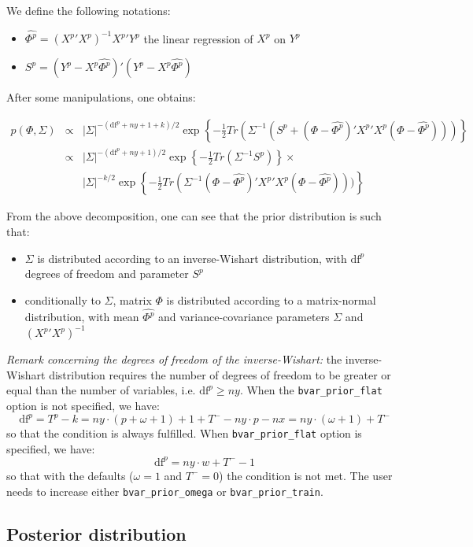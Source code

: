 \documentclass[11pt,a4paper]{article}
\newcommand{\df}{\text{df}}
\begin{document}
We define the following notations:
\begin{itemize}
\item $\hat{\Phi^p} = ({X^p}'X^p)^{-1} {X^p}' Y^p$ the linear regression of $X^p$ on $Y^p$
\item $S^p = (Y^p - X^p\hat{\Phi^p})'(Y^p - X^p\hat{\Phi^p})$
\end{itemize}

After some manipulations, one obtains:

\begin{eqnarray*}
p(\Phi, \Sigma) & \propto & |\Sigma|^{-(\df^p + ny + 1 + k)/2} \exp\left\{-\frac{1}{2}Tr(\Sigma^{-1}(S^p + (\Phi-\hat{\Phi^p})'{X^p}'X^p(\Phi-\hat{\Phi^p})))\right\} \\
& \propto & |\Sigma|^{-(\df^p + ny + 1)/2} \exp\left\{-\frac{1}{2}Tr(\Sigma^{-1}S^p)\right\} \times \\
& & |\Sigma|^{-k/2}\exp\left\{-\frac{1}{2}Tr(\Sigma^{-1}(\Phi-\hat{\Phi^p})'{X^p}'X^p(\Phi-\hat{\Phi^p})))\right\}
\end{eqnarray*}

From the above decomposition, one can see that the prior distribution is such that:
\begin{itemize}
\item $\Sigma$ is distributed according to an inverse-Wishart distribution, with $\df^p$ degrees of freedom and parameter $S^p$
\item conditionally to $\Sigma$, matrix $\Phi$ is distributed according to a matrix-normal distribution, with mean $\hat{\Phi^p}$ and variance-covariance parameters $\Sigma$ and $({X^p}'X^p)^{-1}$
\end{itemize}

\emph{Remark concerning the degrees of freedom of the inverse-Wishart:} the inverse-Wishart distribution requires the number of degrees of freedom to be greater or equal than the number of variables, i.e. $\df^p \geq ny$. When the \texttt{bvar\_prior\_flat} option is not specified, we have:
$$\df^p = T^p - k = ny\cdot(p+\omega+1)+1+T^--ny\cdot p-nx = ny\cdot(\omega+1)+T^-$$
so that the condition is always fulfilled. When \texttt{bvar\_prior\_flat} option is specified, we have:
$$\df^p = ny\cdot w + T^- - 1$$
so that with the defaults ($\omega = 1$ and $T^- = 0$) the condition is not met. The user needs to increase either \texttt{bvar\_prior\_omega} or \texttt{bvar\_prior\_train}.

\subsection{Posterior distribution}
\end{document}
